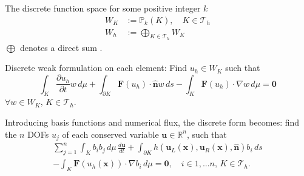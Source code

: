 \documentclass[11pt]{beamer}
\let\bld\boldsymbol
\begin{document}
\begin{frame}
The discrete function space for some positive integer $k$
\begin{align}
W_{K} &:= \mathbb{P}_k(K), \quad K \in \mathcal{T}_h \\
W_h &:= \bigoplus_{K \in \mathcal{T}_h} W_{K}
\end{align}
$\bigoplus$ denotes a direct sum \cite{nodaldg}.

Discrete weak formulation on each element: Find $u_h \in W_{K}$ such that
\begin{equation}
\int_{K} \frac{\partial u_h}{\partial t}w\,d\mu + \int_{\partial K} \bld{F}(u_h)\cdot\hat{\bld{n}}w \,ds - \int_{K}\bld{F}(u_h)\cdot\nabla w \,d\mu = \bld{0} 
\label{wf}
\end{equation}
$ \forall w \in W_{K},\, K \in \mathcal{T}_h$.
\end{frame}
\begin{frame}
Introducing basis functions and numerical flux, the discrete form becomes: find the $n$ DOFs $u_j$ of each conserved variable $\mathbf{u} \in \mathbb{R}^n$, such that
\begin{multline}
\sum_{j=1}^n\int_{K} b_ib_j\,d\mu\, \frac{d\mathbf{u}}{d t} + \int_{\partial K}  h(\bld{u}_L(\bld{x}), \bld{u}_R(\bld{x}), \hat{\bld{n}})b_i \,ds \\ -\int_{K}\bld{F}(u_h(\bld{x}))\cdot\nabla b_i \,d\mu = \bld{0}, \quad i \in {1,...n},\, K \in \mathcal{T}_h.
\label{df}
\end{multline}
\end{frame}
\end{document}
